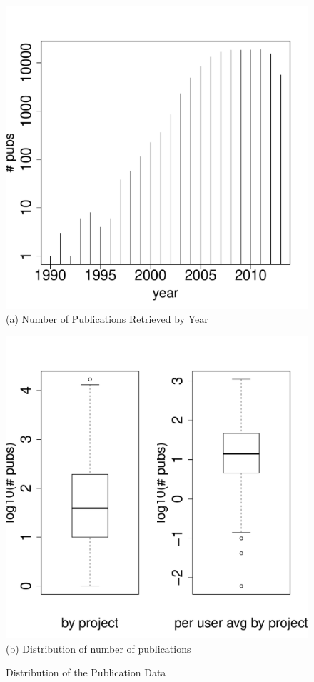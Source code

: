 \documentclass{tex/sig-alternate}
\begin{document}
\begin{figure}[!htb] 
\begin{minipage}[t]{0.22\textwidth}
  \centering 
    \includegraphics[width=1.0\columnwidth]{images/21_pubs_year_distribution.pdf} 
    (a) Number of Publications Retrieved by Year
\ \
\end{minipage}
\begin{minipage}[t]{0.22\textwidth}
  \centering 
    \includegraphics[width=1.0\columnwidth]{images/01_dist_npubs_proj.pdf} 
    (b) Distribution of number of publications
\end{minipage}

\caption{Distribution of the Publication Data}\label{F:dist-npubs}
\end{figure} 
\end{document}
